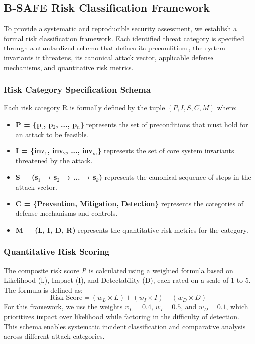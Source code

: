 \subsection{B-SAFE Risk Classification Framework}
\label{sec:methodology_risk_framework}
To provide a systematic and reproducible security assessment, we establish a formal risk classification framework. Each identified threat category is specified through a standardized schema that defines its preconditions, the system invariants it threatens, its canonical attack vector, applicable defense mechanisms, and quantitative risk metrics.

\subsubsection{Risk Category Specification Schema}
Each risk category R is formally defined by the tuple \( (P, I, S, C, M) \) where:
\begin{itemize}
    \item \textbf{P = \{p$_1$, p$_2$, ..., p$_n$\}} represents the set of preconditions that must hold for an attack to be feasible.
    \item \textbf{I = \{inv$_1$, inv$_2$, ..., inv$_m$\}} represents the set of core system invariants threatened by the attack.
    \item \textbf{S = (s$_1$ → s$_2$ → ... → s$_k$)} represents the canonical sequence of steps in the attack vector.
    \item \textbf{C = \{Prevention, Mitigation, Detection\}} represents the categories of defense mechanisms and controls.
    \item \textbf{M = (L, I, D, R)} represents the quantitative risk metrics for the category.
\end{itemize}

\subsubsection{Quantitative Risk Scoring}
The composite risk score \( R \) is calculated using a weighted formula based on Likelihood (L), Impact (I), and Detectability (D), each rated on a scale of 1 to 5. The formula is defined as:
\begin{equation}
    \text{Risk Score} = (w_L \times L) + (w_I \times I) - (w_D \times D)
\end{equation}
For this framework, we use the weights \(w_L=0.4\), \(w_I=0.5\), and \(w_D=0.1\), which prioritizes impact over likelihood while factoring in the difficulty of detection. This schema enables systematic incident classification and comparative analysis across different attack categories.

